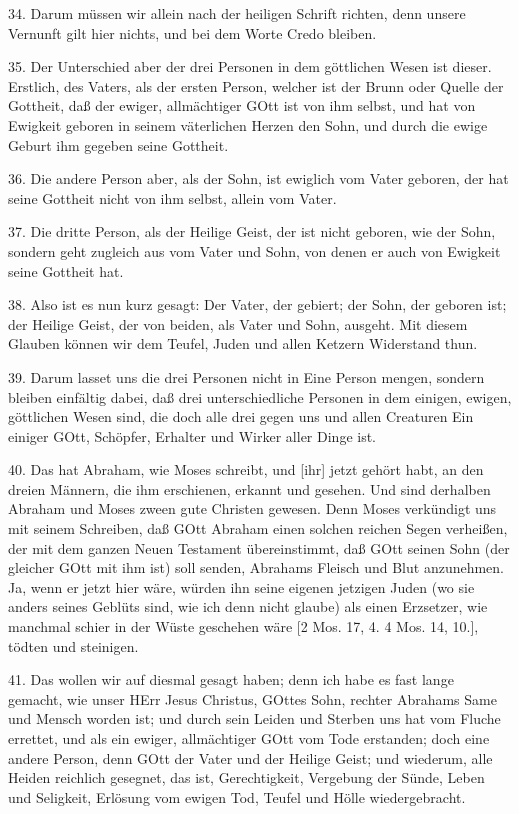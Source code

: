 34. Darum müssen wir allein nach der heiligen Schrift richten, denn unsere Vernunft gilt hier nichts, und bei dem Worte Credo bleiben.

35. Der Unterschied aber der drei Personen in dem göttlichen Wesen ist dieser. Erstlich, des Vaters, als der ersten Person, welcher ist der Brunn oder Quelle der Gottheit, daß der ewiger, allmächtiger GOtt ist von ihm selbst, und hat von Ewigkeit geboren in seinem väterlichen Herzen den Sohn, und durch die ewige Geburt ihm gegeben seine Gottheit.

36. Die andere Person aber, als der Sohn, ist ewiglich vom Vater geboren, der hat seine Gottheit nicht von ihm selbst, allein vom Vater.

37. Die dritte Person, als der Heilige Geist, der ist nicht geboren, wie der Sohn, sondern geht zugleich aus vom Vater und Sohn, von denen er auch von Ewigkeit seine Gottheit hat.

38. Also ist es nun kurz gesagt: Der Vater, der gebiert; der Sohn, der geboren ist; der Heilige Geist, der von beiden, als Vater und Sohn, ausgeht. Mit diesem Glauben können wir dem Teufel, Juden und allen Ketzern Widerstand thun.

39. Darum lasset uns die drei Personen nicht in Eine Person mengen, sondern bleiben einfältig dabei, daß drei unterschiedliche Personen in dem einigen, ewigen, göttlichen Wesen sind, die doch alle drei gegen uns und allen Creaturen Ein einiger GOtt, Schöpfer, Erhalter und Wirker aller Dinge ist.

40. Das hat Abraham, wie Moses schreibt, und [ihr] jetzt gehört habt, an den dreien Männern, die ihm erschienen, erkannt und gesehen. Und sind derhalben Abraham und Moses zween gute Christen gewesen. Denn Moses verkündigt uns mit seinem Schreiben, daß GOtt Abraham einen solchen reichen Segen verheißen, der mit dem ganzen Neuen Testament übereinstimmt, daß GOtt seinen Sohn (der gleicher GOtt mit ihm ist) soll senden, Abrahams Fleisch und Blut anzunehmen. Ja, wenn er jetzt hier wäre, würden ihn seine eigenen jetzigen Juden (wo sie anders seines Geblüts sind, wie ich denn nicht glaube) als einen Erzsetzer, wie manchmal schier in der
Wüste geschehen wäre [2 Mos. 17, 4. 4 Mos. 14, 10.], tödten und steinigen.

41. Das wollen wir auf diesmal gesagt haben; denn ich habe es fast lange gemacht, wie unser HErr Jesus Christus, GOttes Sohn, rechter Abrahams Same und Mensch worden ist; und durch sein Leiden und Sterben uns hat vom Fluche errettet, und als ein ewiger, allmächtiger GOtt vom Tode erstanden; doch eine andere Person, denn GOtt der Vater und der Heilige Geist; und wiederum, alle Heiden reichlich gesegnet, das ist, Gerechtigkeit, Vergebung der Sünde, Leben und Seligkeit, Erlösung vom ewigen Tod, Teufel und Hölle wiedergebracht.


